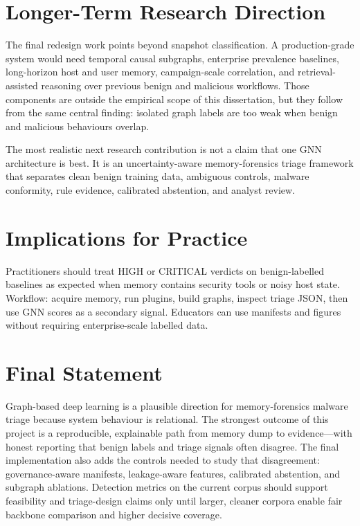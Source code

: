 \section{Longer-Term Research Direction}

The final redesign work points beyond snapshot classification. A production-grade system would need temporal causal subgraphs, enterprise prevalence baselines, long-horizon host and user memory, campaign-scale correlation, and retrieval-assisted reasoning over previous benign and malicious workflows. Those components are outside the empirical scope of this dissertation, but they follow from the same central finding: isolated graph labels are too weak when benign and malicious behaviours overlap.

The most realistic next research contribution is not a claim that one GNN architecture is best. It is an uncertainty-aware memory-forensics triage framework that separates clean benign training data, ambiguous controls, malware conformity, rule evidence, calibrated abstention, and analyst review.

\section{Implications for Practice}

Practitioners should treat HIGH or CRITICAL verdicts on benign-labelled baselines as expected when memory contains security tools or noisy host state. Workflow: acquire memory, run plugins, build graphs, inspect triage JSON, then use GNN scores as a secondary signal. Educators can use manifests and figures without requiring enterprise-scale labelled data.

\section{Final Statement}

Graph-based deep learning is a plausible direction for memory-forensics malware triage because system behaviour is relational. The strongest outcome of this project is a reproducible, explainable path from memory dump to evidence---with honest reporting that benign labels and triage signals often disagree. The final implementation also adds the controls needed to study that disagreement: governance-aware manifests, leakage-aware features, calibrated abstention, and subgraph ablations. Detection metrics on the current corpus should support feasibility and triage-design claims only until larger, cleaner corpora enable fair backbone comparison and higher decisive coverage.

